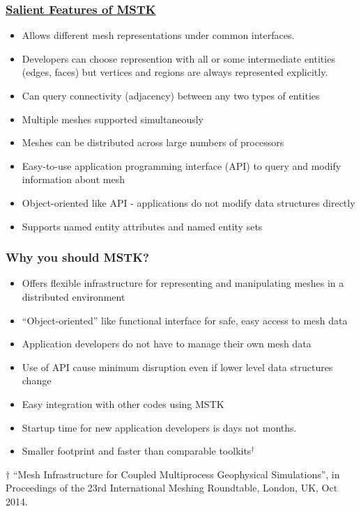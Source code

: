 \documentclass{beamer}
\begin{document}
\begin{frame}
  \frametitle{\underline{Salient Features of MSTK}}

\begin{itemize} 
\item Allows different mesh representations under common interfaces.
\item Developers can choose represention with all or some intermediate
  entities (edges, faces) but vertices and regions are always represented explicitly.
\item Can query connectivity (adjacency) between any two types of entities
\item Multiple meshes supported simultaneously
\item Meshes can be distributed across large numbers of processors
\item Easy-to-use application programming interface (API) to
  query and modify information about mesh
\item Object-oriented like API - applications do not modify data structures directly
\item Supports named entity attributes and named entity sets
\end{itemize}

\end{frame}

\begin{frame}
\frametitle{Why you should MSTK?}

\begin{itemize}
\item Offers flexible infrastructure for representing and
manipulating meshes in a distributed environment 
\item ``Object-oriented'' like functional interface for safe, easy access to mesh data
\item Application developers do not have to manage their own mesh data 
\item Use of API cause minimum disruption even if lower level data structures change
\item Easy integration with other codes using MSTK
\item Startup time for new application developers is days not months.
\item Smaller footprint and faster than comparable toolkits$^\dag$
\end{itemize}

$\dag$ ``Mesh Infrastructure for Coupled Multiprocess Geophysical
Simulations'', in Proceedings of the 23rd International Meshing Roundtable,
London, UK, Oct 2014.
\end{frame}
\end{document}
